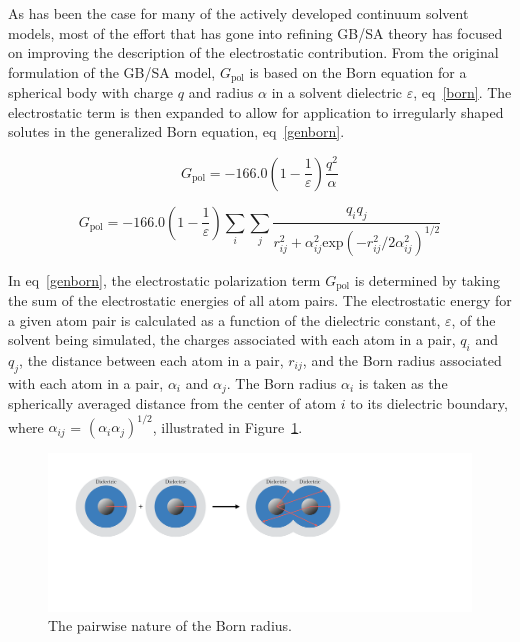 \documentclass[12pt]{report}
\def\figlab{Figure}\def\figslab{\figlab s}
\def\equlab{eq}\def\equslab{Eqs.}
\newcommand*\eq[1]{\equlab~\ref{#1}}
\newcommand*\fig[1]{\figlab~\ref{#1}}
\begin{document}
As has been the case for many of the actively developed continuum solvent models, most of the effort that has gone into refining GB/SA theory has focused on improving the description of the electrostatic contribution. \cite{orozco, floris, grant, jayaram} From the original formulation of the GB/SA model,\cite{still} $G_{\textrm{pol}}$ is based on the Born equation for a spherical body with charge $q$ and radius $\alpha$ in a solvent dielectric $\varepsilon$, \eq{born}. The electrostatic term is then expanded to allow for application to irregularly shaped solutes in the generalized Born equation, \eq{genborn}.

\vspace*{-0.4cm}
\begin{equation}
\label{born}
G_{\textrm{pol}} = -166.0 \left(1 - \frac{1}{\varepsilon}\right) \frac{q^{2}}{\alpha}
\end{equation}
\vspace*{-0.8cm}

\vspace*{-0.2cm}
\begin{equation}
\label{genborn}
G_{\textrm{pol}} = -166.0 \left( 1 - \frac{1}{\varepsilon} \right) \sum_i \sum_j \frac{q_i q_j}{r_{ij}^{2} + \alpha_{ij}^{2} \textrm{exp} (-r_{ij}^{2} / 2 \alpha_{ij}^{2})^{1/2}}
\end{equation}
\vspace*{-0.1cm}

In \eq{genborn}, the electrostatic polarization term $G_{\textrm{pol}}$ is determined by taking the sum of the electrostatic energies of all atom pairs. The electrostatic energy for a given atom pair is calculated as a function of the dielectric constant, $\varepsilon$, of the solvent being simulated, the charges associated with each atom in a pair, $q_{i}$ and $q_{j}$, the distance between each atom in a pair, $r_{ij}$, and the Born radius associated with each atom in a pair, $\alpha_{i}$ and $\alpha_{j}$. The Born radius $\alpha_{i}$ is taken as the spherically averaged distance from the center of atom $i$ to its dielectric boundary, where $\alpha_{ij}$ = $(\alpha_{i}\alpha_{j})^{1/2}$, illustrated in \fig{bornrad}. 
\vspace*{1cm}

\vspace*{-0.3cm}
\begin{figure}[ht]
\centering
\includegraphics[scale=0.33]{figures/pdf/bornradius.pdf}
\caption{The pairwise nature of the Born radius.}
\label{bornrad}
\end{figure}
\vspace*{0.2cm}
\end{document}
